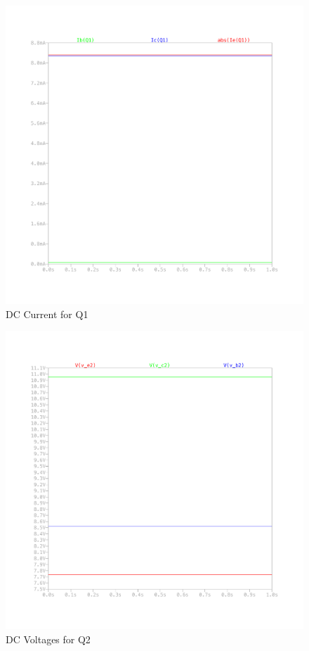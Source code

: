 \documentclass{article}
\begin{document}
\begin{figure}[H]
    \centering
    \includegraphics[height=0.4\textheight,trim={30mm 30mm 30mm 30mm}]{img/Amplifier Design Q1 I.pdf}
    \caption{DC Current for Q1}
    \label{fig:dc-i-q1}
\end{figure}

\begin{figure}[H]
    \centering
    \includegraphics[height=0.4\textheight,trim={30mm 30mm 30mm 30mm}]{img/Amplifier Design Q2 V.pdf}
    \caption{DC Voltages for Q2}
    \label{fig:dc-v-q2}
\end{figure}
\end{document}
